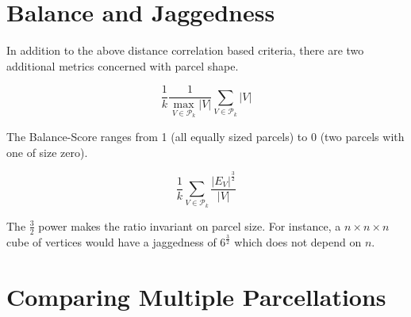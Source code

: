 \section{Balance and Jaggedness}

In addition to the above distance correlation based criteria, there are
two additional metrics concerned with parcel shape.

\begin{definition}[Balance] \label{balance}
\[ \frac{1}{k} \frac{1}{\max_{V \in \mathcal{P}_k} |V|}
   \sum_{V \in \mathcal{P}_k} |V| \]
\end{definition}

The Balance-Score ranges from 1 (all equally sized parcels) to
0 (two parcels with one of size zero).

\begin{definition}[Jaggedness] \label{jaggedness}
\[ \frac{1}{k} \sum_{V \in \mathcal{P}_k} \frac{|E_V|^\frac{3}{2}}{|V|}
\]
\end{definition}

The $\frac{3}{2}$ power makes the ratio invariant on parcel size.
For instance, a $n \times n \times n$ cube of vertices would have
a jaggedness of $6^{\frac{3}{2}}$ which does not depend on $n$.

\section{Comparing Multiple Parcellations}
